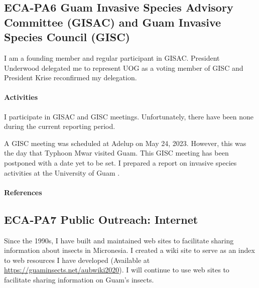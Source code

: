 \subsection{ECA-PA6 Guam Invasive Species Advisory Committee (GISAC) and Guam Invasive Species Council (GISC)}
\begin{refsection}
	
I am a founding member and regular participant in GISAC. President Underwood delegated me to represent UOG as a voting member of GISC and President Krise reconfirmed my delegation.

\paragraph{Activities}

I participate in GISAC and GISC meetings. Unfortunately, there have been none during the current reporting period.

A GISC meeting was scheduled at Adelup on May 24, 2023. However, this was the day that Typhoon Mwar visited Guam. This GISC meeting has been postponed with a date yet to be set. I prepared a report on invasive species activities at the University of Guam \cite{GISC2023}.

\paragraph{References}
\printbibliography[heading=none]
\end{refsection}	

\subsection{ECA-PA7 Public Outreach: Internet}

Since the 1990s, I have built and maintained web sites to facilitate sharing information about insects in Micronesia. I created a wiki site to serve as an index to web resources I have developed (Available at  \url{https://guaminsects.net/aubwiki2020}). I will continue to use web sites to facilitate sharing information on Guam's insects.

